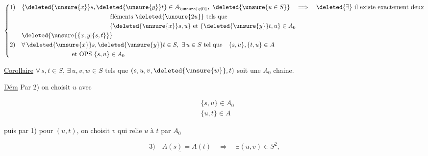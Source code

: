
\[
\left\{\begin{aligned}
1)\quad &\{\deleted{\unsure{x}}s,\deleted{\unsure{y}}t\}\in A_{\unsure{q|0}},\ \deleted{\unsure{u\in S}}\quad\Longrightarrow\quad
\deleted{\exists}\ \text{il existe exactement deux}\\
&\hspace{14em}\text{éléments }\deleted{\unsure{2u}}\ \text{tels que}\\
&\hspace{14em}\{\deleted{\unsure{x}}s,u\}\ \text{et }\{\deleted{\unsure{y}}t,u\}\in A_0\\
&\deleted{\unsure{\{x,y|\{s,t\}}}\\
2)\quad &\forall\,\deleted{\unsure{x}}s,\deleted{\unsure{y}}t\in S,\ \exists\,u\in S\ \text{tel que}\quad\{s,u\},\{t,u\}\in A\\
&\hspace{8em}\text{et OPS }\{s,u\}\in A_0
\end{aligned}\right.
\]

\qquad \uline{Corollaire} $\forall\,s,t\in S$, $\exists\,u,v,w\in S$ tels que $(s,u,v,\deleted{\unsure{w}},t)$ soit une $A_0$ chaine.


\uline{Dém} Par 2)  on choisit $u$ avec

\[
\begin{aligned}
&\{s,u\}\in A_0\\
&\{u,t\}\in A
\end{aligned}
\]

puis par 1) pour $(u,t)$, on choisit $v$ qui relie $u$ à $t$ par $A_0$

\[
\underline{3)\quad A(s)=A(t)}\quad\Longrightarrow\quad\exists(u,v)\in S^2,
\]


